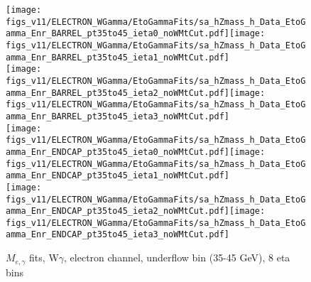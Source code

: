\begin{figure}[htb]
  \begin{center}
   \texttt{[image: figs\_v11/ELECTRON\_WGamma/EtoGammaFits/sa\_hZmass\_h\_Data\_EtoGamma\_Enr\_BARREL\_pt35to45\_ieta0\_noWMtCut.pdf]}\texttt{[image: figs\_v11/ELECTRON\_WGamma/EtoGammaFits/sa\_hZmass\_h\_Data\_EtoGamma\_Enr\_BARREL\_pt35to45\_ieta1\_noWMtCut.pdf]}\\
   \texttt{[image: figs\_v11/ELECTRON\_WGamma/EtoGammaFits/sa\_hZmass\_h\_Data\_EtoGamma\_Enr\_BARREL\_pt35to45\_ieta2\_noWMtCut.pdf]}\texttt{[image: figs\_v11/ELECTRON\_WGamma/EtoGammaFits/sa\_hZmass\_h\_Data\_EtoGamma\_Enr\_BARREL\_pt35to45\_ieta3\_noWMtCut.pdf]}\\
   \texttt{[image: figs\_v11/ELECTRON\_WGamma/EtoGammaFits/sa\_hZmass\_h\_Data\_EtoGamma\_Enr\_ENDCAP\_pt35to45\_ieta0\_noWMtCut.pdf]}\texttt{[image: figs\_v11/ELECTRON\_WGamma/EtoGammaFits/sa\_hZmass\_h\_Data\_EtoGamma\_Enr\_ENDCAP\_pt35to45\_ieta1\_noWMtCut.pdf]}\\
   \texttt{[image: figs\_v11/ELECTRON\_WGamma/EtoGammaFits/sa\_hZmass\_h\_Data\_EtoGamma\_Enr\_ENDCAP\_pt35to45\_ieta2\_noWMtCut.pdf]}\texttt{[image: figs\_v11/ELECTRON\_WGamma/EtoGammaFits/sa\_hZmass\_h\_Data\_EtoGamma\_Enr\_ENDCAP\_pt35to45\_ieta3\_noWMtCut.pdf]}\\
  \label{fig:etogFits_35to45}
  \caption{$M_{e,\gamma}$ fits, W$\gamma$, electron channel, underflow bin (35-45 GeV), 8 eta bins}
  \end{center}
\end{figure}

